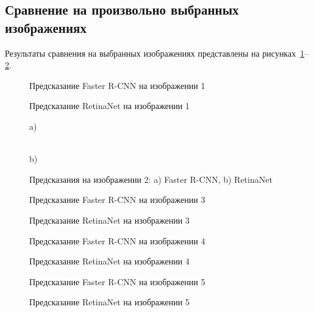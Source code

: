 \subsection{Сравнение на произвольно выбранных изображениях}
Результаты сравнения на выбранных изображениях представлены на рисунках~\ref{loc1}--\ref{loc5}.

\begin{figure}[H]
	\center{\texttt{[image: l1-f]}}
	\caption{Предсказание Faster R-CNN на изображении 1} 
	\label{loc1}
\end{figure}
\begin{figure}[H]
	\center{\texttt{[image: l1-r]}}
	\caption{Предсказание RetinaNet на изображении 1} 
\end{figure}

\begin{figure}[H]
	\begin{minipage}[h]{0.49\linewidth}
		\center{\texttt{[image: l2-f]}} a) \\
	\end{minipage}
	\hfill
	\begin{minipage}[h]{0.51\linewidth}
		\center{\texttt{[image: l2-r]}} \\b)
	\end{minipage}
	\caption{Предсказания на изображении 2: a) Faster R-CNN, b) RetinaNet}
\end{figure}

\begin{figure}[H]
	\center{\texttt{[image: l3-f]}}
	\caption{Предсказание Faster R-CNN на изображении 3} 
\end{figure}
\begin{figure}[H]
	\center{\texttt{[image: l3-r]}}
	\caption{Предсказание RetinaNet на изображении 3} 
\end{figure}

\begin{figure}[H]
	\center{\texttt{[image: l4-f]}}
	\caption{Предсказание Faster R-CNN на изображении 4} 	
\end{figure}
\begin{figure}[H]
	\center{\texttt{[image: l4-r]}}
	\caption{Предсказание RetinaNet на изображении 4} 
\end{figure}

\begin{figure}[H]
	\center{\texttt{[image: l5-f]}}
	\caption{Предсказание Faster R-CNN на изображении 5} 	
\end{figure}
\begin{figure}[H]
	\center{\texttt{[image: l5-r]}}
	\caption{Предсказание RetinaNet на изображении 5} 
	\label{loc5}
\end{figure}

